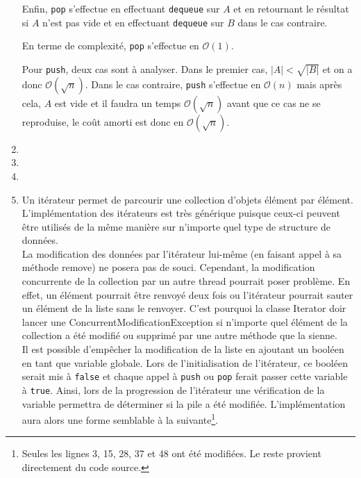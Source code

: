 \begin{enumerate}
	Enfin, \lstinline{pop}\lstinline{} s'effectue en
	effectuant \lstinline{dequeue}\lstinline{} sur $A$
	et en retournant le résultat si $A$ n'est pas vide
	et en effectuant \lstinline{dequeue}\lstinline{}
	sur $B$ dans le cas contraire.
	
	En terme de complexité,
	\lstinline{pop}\lstinline{} s'effectue en
	$\mathcal{O}(1)$.
	
	Pour \lstinline{push}\lstinline{}, deux cas sont
	à analyser. Dans le premier cas,
	$|A| < \sqrt{|B|}$ et on a donc
	$\mathcal{O}(\sqrt{n})$. Dans le cas contraire,
	\lstinline{push}\lstinline{} s'effectue en
	$\mathcal{O}(n)$ mais après cela, $A$ est vide et
	il faudra un temps $\mathcal{O}(\sqrt{n})$ avant
	que ce cas ne se reproduise, le coût amorti est
	donc en $\mathcal{O}(\sqrt{n})$.
	\item
	\item
	\item
	\item 
	Un itérateur permet de parcourir une collection d'objets élément par élément. L'implémentation des itérateurs est très générique puisque ceux-ci peuvent être utilisés de la même manière sur n'importe quel type de structure de données.\\
	
	 La modification des données par l'itérateur lui-même (en faisant appel à sa méthode remove) ne posera pas de souci. Cependant, la modification concurrente de la collection par un autre thread pourrait poser problème. En effet, un élément pourrait être renvoyé deux fois ou l'itérateur pourrait sauter un élément de la liste sans le renvoyer. C'est pourquoi la classe Iterator doir lancer une ConcurrentModificationException si n'importe quel élément de la collection a été modifié ou supprimé par une autre méthode que la sienne.\cite{iter-openclass} \\
	 
	 Il est possible d'empêcher la modification de la liste en ajoutant un booléen en tant que variable globale. Lors de l'initialisation de l'itérateur, ce booléen serait mis à \lstinline{false}\lstinline{} et chaque appel à \lstinline{push}\lstinline{} ou \lstinline{pop}\lstinline{} ferait passer cette variable à \lstinline{true}\lstinline{}. Ainsi, lors de la progression de l'itérateur une vérification de la variable permettra de déterminer si la pile a été modifiée. L'implémentation aura alors une forme semblable à la suivante\footnote{Seules les lignes 3, 15, 28, 37 et 48 ont été modifiées. Le reste provient directement du code source.}.\\
	 

\end{enumerate}
